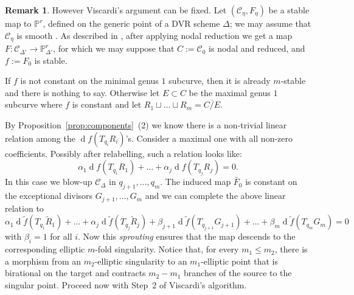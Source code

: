 \documentclass[11pt]{amsart}
\newcommand{\PP}{\mathbb P}
\renewcommand{\to}{\rightarrow}
\newcommand{\cC}{\mathcal C}
\newcommand{\dvr}{\Delta}
\theoremstyle{plain}
\theoremstyle{definition}
\newtheorem{remark}[thm]{Remark}
\begin{document}
\begin{remark}
However Viscardi's argument can be fixed. Let $(\mathcal{C}_\eta,F_{\eta})$ be a stable map to $\PP^r$, defined on the generic point of a DVR scheme $\dvr$; we may assume that $\mathcal C_{\eta}$ is smooth \cite[Section~3.2.1]{VISC}. 
As described in \cite[Theorem~3.6, Step~1]{VISC}, after applying nodal reduction we get a map $F\colon\mathcal C_{\dvr'}\to\PP^r_{\dvr'}$, for which we may suppose that $C:=\cC_0$ is nodal and reduced, and $f:=F_0$ is stable.

If $f$ is not constant on the minimal genus $1$ subcurve, then it is already $m$-stable and there is nothing to say. Otherwise let $E\subset C$ be the maximal genus $1$ subcurve where $f$ is constant and let $R_1\sqcup\ldots\sqcup R_m=\overline{C/E}$.

 By Proposition~\ref{prop:components}~(2) we know there is a non-trivial linear relation among the $\operatorname{d}\!f(T_{q_i}R_i)$'s.
 Consider a maximal one with all non-zero coefficients.  Possibly after relabelling, such a relation looks like:
 \begin{equation*}\label{eq:linrelation}
 \alpha_1\operatorname{d}\!f(T_{q_{1}}R_{1})+\ldots +\alpha_j \operatorname{d}\!f(T_{q_{j}}R_{j})=0.
 \end{equation*}
 In this case we blow-up $\mathcal{C}_\dvr$ in $q_{j+1},\ldots, q_m$. The induced map $\tilde{F_0}$ is constant on the exceptional divisors $G_{j+1},\ldots, G_m$ and we can complete the above linear relation to 
 \[\alpha_1\operatorname{d}\!\tilde f(T_{q_{1}}\tilde R_{1})+\ldots +\alpha_j \operatorname{d}\!\tilde f(T_{q_{j}}\tilde R_{j})+\beta_{j+1}\operatorname{d}\!\tilde f(T_{q_{j+1}}G_{j+1})+\ldots+\beta_m\operatorname{d}\!\tilde f(T_{q_{m}}G_m)=0\]
  with $\beta_i=1$ for all $i$. Now this \emph{sprouting} \cite[Section 2.3]{SMY2} ensures that the map descends to the corresponding elliptic $m$-fold singularity. Notice that, for every $m_1\leq m_2$, there is a morphism from an $m_2$-elliptic singularity to an $m_1$-elliptic point that is birational on the target and contracts $m_2-m_1$ branches of the source to the singular point. Proceed now with Step~2 of Viscardi's algorithm.
  

\end{remark}
\end{document}
